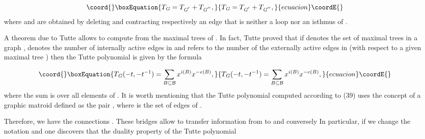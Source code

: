 \documentclass[a4paper,12pt]{article}
\begin{document}
\begin{equation}\coord{}\boxEquation{
T_{\mathit{G}}=T_{\mathit{G}^{^{\prime }}}+T_{\mathit{G}^{^{\prime \prime
}}},  \label{38}
}{
T_{\mathit{G}}=T_{\mathit{G}^{^{\prime }}}+T_{\mathit{G}^{^{\prime \prime
}}},  }{ecuacion}\coordE{}\end{equation}
where \coordHE{} and \coordHE{} are obtained
by deleting and contracting respectively an edge that is neither a loop nor
an isthmus of \coordHE{}.

A theorem due to Tutte allows to compute \coordHE{} from
the maximal trees of \coordHE{}. In fact, Tutte proved that if \coordHE{} denotes the set of maximal trees in a graph \coordHE{}, \coordHE{}
denotes the number of internally active edges in \coordHE{} and \coordHE{}
refers to the number of the externally active edges in \coordHE{} (with
respect to a given maximal tree \coordHE{}) then the Tutte
polynomial is given by the formula

\begin{equation}\coord{}\boxEquation{
T_{\mathit{G}}(-t,-t^{-1})=\sum_{B\subseteq \mathcal{B}}x^{i(B)}x^{-e(B)},
\label{39}
}{
T_{\mathit{G}}(-t,-t^{-1})=\sum_{B\subseteq \mathcal{B}}x^{i(B)}x^{-e(B)},
}{ecuacion}\coordE{}\end{equation}
where the sum is over all elements of \coordHE{}. It is worth mentioning
that the Tutte polynomial \coordHE{} computed according to
(39) uses the concept of a graphic matroid \coordHE{} defined as the
pair \coordHE{}, where \coordHE{} is the set of edges of \coordHE{}.

Therefore, we have the connections \coordHE{}. These bridges
allow to transfer information from \coordHE{} to \coordHE{} and conversely%
\coordHE{} In particular, if we change the notation \coordHE{} and \coordHE{} one discovers that the duality property of the Tutte
polynomial
\end{document}
